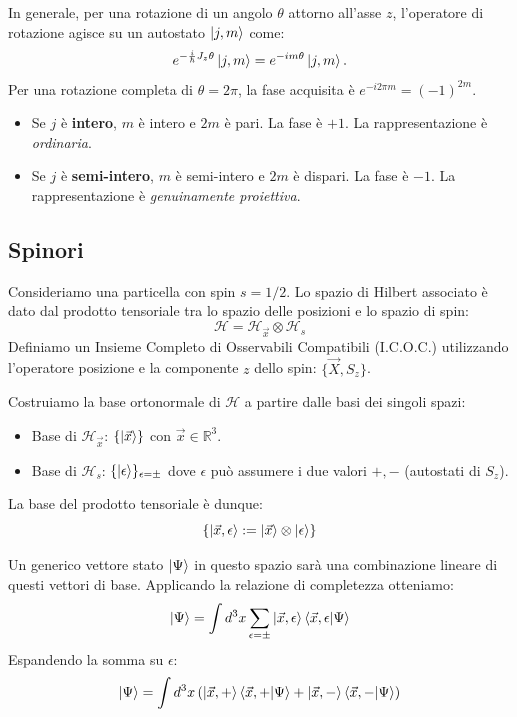 In generale, per una rotazione di un angolo \(\theta\) attorno all'asse \(z\), l'operatore di rotazione agisce su un autostato \(\ket{j,m}\) come:
\[
    e^{-\frac{i}{\hbar}J_z \theta} \ket{j,m} = e^{-i m \theta} \ket{j,m}.
\]
Per una rotazione completa di \(\theta = 2\pi\), la fase acquisita è \(e^{-i 2\pi m} = (-1)^{2m}\).
\begin{itemize}
    \item Se \(j\) è \textbf{intero}, \(m\) è intero e \(2m\) è pari. La fase è \(+1\). La rappresentazione è \textit{ordinaria}.
    \item Se \(j\) è \textbf{semi-intero}, \(m\) è semi-intero e \(2m\) è dispari. La fase è \(-1\). La rappresentazione è \textit{genuinamente proiettiva}.
\end{itemize}

\subsection{Spinori}

Consideriamo una particella con spin \( s=1/2 \). Lo spazio di Hilbert associato è dato dal prodotto tensoriale tra lo spazio delle posizioni e lo spazio di spin:
\[
    \mathcal{H} = \mathcal{H}_{\vec{x}} \otimes \mathcal{H}_s
\]
Definiamo un Insieme Completo di Osservabili Compatibili (I.C.O.C.) utilizzando l'operatore posizione e la componente \( z \) dello spin: \( \{ \vec{X}, S_z \} \).

Costruiamo la base ortonormale di \( \mathcal{H} \) a partire dalle basi dei singoli spazi:
\begin{itemize}
    \item Base di \( \mathcal{H}_{\vec{x}} \): \( \{ \ket{\vec{x}} \} \) con \( \vec{x} \in \mathbb{R}^3 \).
    \item Base di \( \mathcal{H}_s \): \( \{ \ket{\epsilon} \}_{\epsilon=\pm} \) dove \( \epsilon \) può assumere i due valori \( +, - \) (autostati di \( S_z \)).
\end{itemize}

La base del prodotto tensoriale è dunque:
\[
    \{ \ket{\vec{x}, \epsilon} := \ket{\vec{x}} \otimes \ket{\epsilon} \}
\]

Un generico vettore stato \( \ket{\Psi} \) in questo spazio sarà una combinazione lineare di questi vettori di base. Applicando la relazione di completezza otteniamo:
\[
    \ket{\Psi} = \int d^3x \sum_{\epsilon=\pm} \ket{\vec{x}, \epsilon} \braket{\vec{x}, \epsilon}{\Psi}
\]
Espandendo la somma su \( \epsilon \):
\[
    \ket{\Psi} = \int d^3x \left( \ket{\vec{x}, +}\braket{\vec{x}, +}{\Psi} + \ket{\vec{x}, -}\braket{\vec{x}, -}{\Psi} \right)
\]

